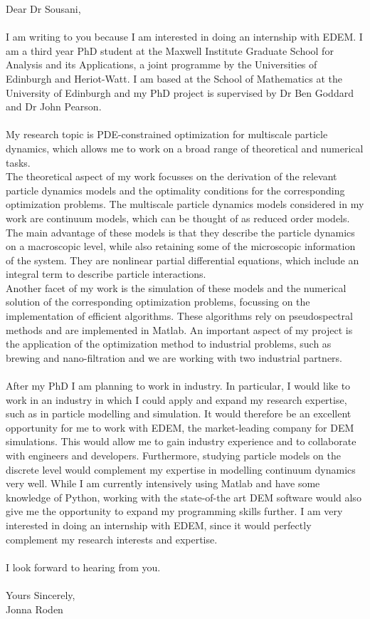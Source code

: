 \documentclass[11pt, letterpaper]{article}
\begin{document}
\justify
\vspace{0.4 cm}
Dear Dr Sousani,\\
\\
\noindent
I am writing to you because I am interested in doing an internship with EDEM. I am a third year PhD student at the Maxwell Institute Graduate School for Analysis and its Applications, a joint programme by the Universities of Edinburgh and Heriot-Watt. I am based at the School of Mathematics at the University of Edinburgh and my PhD project is supervised by Dr Ben Goddard and Dr John Pearson.\\
\\
\noindent
My research topic is PDE-constrained optimization for multiscale particle dynamics, which allows me to work on a broad range of theoretical and numerical tasks.\\
The theoretical aspect of my work focusses on the derivation of the relevant particle dynamics models and the optimality conditions for the corresponding optimization problems. The multiscale particle dynamics models considered in my work are continuum models, which can be thought of as reduced order models. The main advantage of these models is that they describe the particle dynamics on a macroscopic level, while also retaining some of the microscopic information of the system. They are nonlinear partial differential equations, which include an integral term to describe particle interactions. 
\\
Another facet of my work is the simulation of these models and the numerical solution of the corresponding optimization problems, focussing on the implementation of efficient algorithms. These algorithms rely on pseudospectral methods and are implemented in Matlab. An important aspect of my project is the application of the optimization method to industrial problems, such as brewing and nano-filtration and we are working with two industrial partners.\\
\\
\noindent
After my PhD I am planning to work in industry. In particular, I would like to work in an industry in which I could apply and expand my research expertise, such as in particle modelling and simulation. It would therefore be an excellent opportunity for me to work with EDEM, the market-leading company for DEM simulations. This would allow me to gain industry experience and to collaborate with engineers and developers. Furthermore, studying particle models on the discrete level would complement my expertise in modelling continuum dynamics very well. While I am currently intensively using Matlab and have some knowledge of Python, working with the state-of-the art DEM software would also give me the opportunity to expand my programming skills further. 
I am very interested in doing an internship with EDEM, since it would perfectly complement my research interests and expertise.
\\
\\
\noindent
I look forward to hearing from you.\\
\\
\noindent
Yours Sincerely,\\
Jonna Roden

 	
	
	
	
	
	
	
\end{document}
